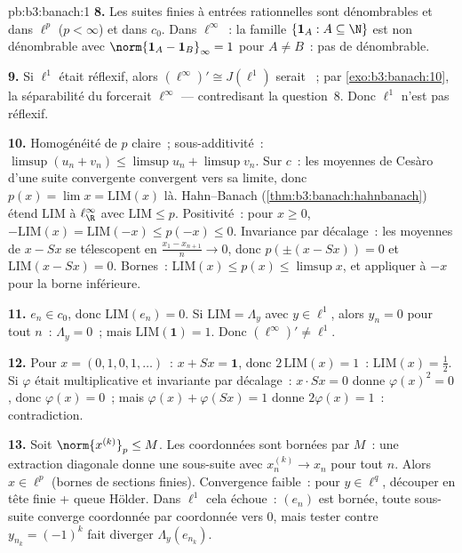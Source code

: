 \begin{solution}{pb:b3:banach:1}
\textbf{8.} Les suites finies à entrées rationnelles sont
dénombrables et  dans $\ell^p$ ($p < \infty$) et dans
$c_0$. Dans $\ell^\infty$~: la famille $\{\mathbf 1_A : A
\subseteq \N\}$ est non dénombrable avec $\norm{\mathbf 1_A -
\mathbf 1_B}_\infty = 1$ pour $A \neq B$~: pas de 
dénombrable.

\textbf{9.} Si $\ell^1$ était réflexif, alors $(\ell^\infty)'
\cong J(\ell^1)$ serait ~; par
\cref{exo:b3:banach:10}, la séparabilité du  forcerait
$\ell^\infty$  --- contredisant la question~8. Donc
$\ell^1$ n'est pas réflexif.

\textbf{10.} Homogénéité de $p$ claire~; sous-additivité~:
$\limsup(u_n + v_n) \leq \limsup u_n + \limsup v_n$. Sur
$c$~: les moyennes de Cesàro d'une suite convergente
convergent vers sa limite, donc $p(x) = \lim x =
\mathrm{LIM}(x)$ là. Hahn--Banach
(\cref{thm:b3:banach:hahnbanach}) étend $\mathrm{LIM}$ à
$\ell^\infty_\R$ avec $\mathrm{LIM} \leq p$. Positivité~:
pour $x \geq 0$, $-\mathrm{LIM}(x) = \mathrm{LIM}(-x) \leq
p(-x) \leq 0$. Invariance par décalage~: les moyennes de $x -
Sx$ se télescopent en $\frac{x_1 - x_{n+1}}n \to 0$, donc
$p(\pm(x - Sx)) = 0$ et $\mathrm{LIM}(x - Sx) = 0$. Bornes~:
$\mathrm{LIM}(x) \leq p(x) \leq \limsup x$, et appliquer à
$-x$ pour la borne inférieure.

\textbf{11.} $e_n \in c_0$, donc $\mathrm{LIM}(e_n) = 0$. Si
$\mathrm{LIM} = \Lambda_y$ avec $y \in \ell^1$, alors $y_n =
0$ pour tout $n$~: $\Lambda_y = 0$~; mais
$\mathrm{LIM}(\mathbf 1) = 1$. Donc $(\ell^\infty)' \neq
\ell^1$.

\textbf{12.} Pour $x = (0,1,0,1,\dots)$~: $x + Sx = \mathbf
1$, donc $2\,\mathrm{LIM}(x) = 1$~: $\mathrm{LIM}(x) =
\frac12$. Si $\varphi$ était multiplicative et invariante par
décalage~: $x\cdot Sx = 0$ donne $\varphi(x)^2 = 0$, donc
$\varphi(x) = 0$~; mais $\varphi(x) + \varphi(Sx) = 1$ donne
$2\varphi(x) = 1$~: contradiction.

\textbf{13.} Soit $\norm{x^{(k)}}_p \leq M$. Les coordonnées
sont bornées par $M$~: une extraction diagonale donne une
sous-suite avec $x^{(k)}_n \to x_n$ pour tout $n$. Alors $x
\in \ell^p$ (bornes de sections finies). Convergence faible~:
pour $y \in \ell^q$, découper en tête finie + queue Hölder.
Dans $\ell^1$ cela échoue~: $(e_n)$ est bornée, toute
sous-suite converge coordonnée par coordonnée vers $0$, mais
tester contre $y_{n_k} = (-1)^k$ fait diverger
$\Lambda_y(e_{n_k})$.


\end{solution}
